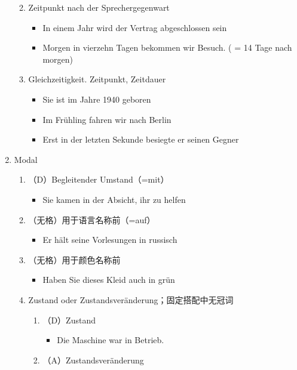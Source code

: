 \documentclass[UTF8]{report}
\begin{document}
\begin{enumerate}
\begin{enumerate}
\begin{itemize}
        \end{itemize}
        \item Zeitpunkt nach der Sprechergegenwart
        \begin{itemize}
            \item In einem Jahr wird der Vertrag abgeschlossen sein
            \item Morgen in vierzehn Tagen bekommen wir Besuch. ( = 14 Tage nach morgen)
        \end{itemize}
        \item Gleichzeitigkeit. Zeitpunkt, Zeitdauer
        \begin{itemize}
            \item Sie ist im Jahre 1940 geboren
            \item Im Frühling fahren wir nach Berlin
            \item Erst in der letzten Sekunde besiegte er seinen Gegner
        \end{itemize}
    \end{enumerate}
    \item Modal
    \begin{enumerate}
        \item （D）Begleitender Umstand（=mit）
        \begin{itemize}
            \item Sie kamen in der Absicht, ihr zu helfen
        \end{itemize}
        \item（无格）用于语言名称前（=auf）
        \begin{itemize}
            \item Er hält seine Vorlesungen in russisch
        \end{itemize}
        \item（无格）用于颜色名称前
        \begin{itemize}
            \item Haben Sie dieses Kleid auch in grün
        \end{itemize}
        \item Zustand oder Zustandsveränderung；固定搭配中无冠词
        \begin{enumerate}
            \item（D）Zustand
            \begin{itemize}
                \item Die Maschine war in Betrieb.
            \end{itemize}
            \item（A）Zustandsveränderung

\end{enumerate}
\end{enumerate}
\end{enumerate}
\end{document}
